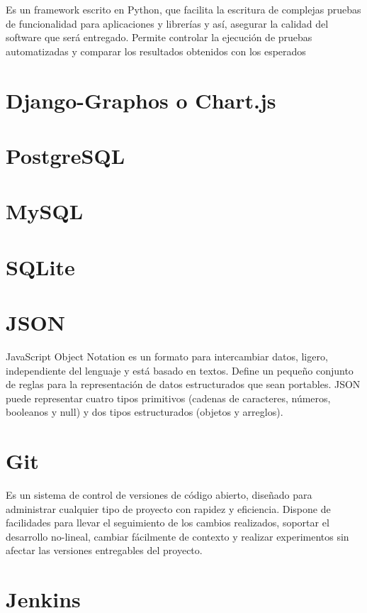 Es un framework escrito en Python, que facilita la escritura de complejas pruebas de funcionalidad para aplicaciones y librerías y así, asegurar la calidad del software que será entregado. Permite controlar la ejecución de pruebas automatizadas y comparar los resultados obtenidos con los esperados \citep{pytest}

\section{Django-Graphos o Chart.js}
\section{PostgreSQL}
\section{MySQL}
\section{SQLite}

\section{JSON}

JavaScript Object Notation es un formato para intercambiar datos, ligero, independiente del lenguaje y está basado en textos. Define un pequeño conjunto de reglas para la representación de datos estructurados que sean portables. JSON puede representar cuatro tipos primitivos (cadenas de caracteres, números, booleanos y null) y dos tipos estructurados (objetos y arreglos).
\citep{JSON}

\section{Git}

Es un sistema de control de versiones de código abierto, diseñado para administrar cualquier tipo de proyecto con rapidez y eficiencia. Dispone de facilidades para llevar el seguimiento de los cambios realizados, soportar el desarrollo no-lineal, cambiar fácilmente de contexto y realizar experimentos sin afectar las versiones entregables del proyecto. 
\citep{Git}

\section{Jenkins}

